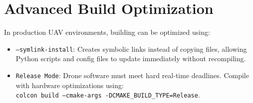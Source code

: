 \documentclass{article}
\begin{document}
\section{Advanced Build Optimization}
In production UAV environments, building can be optimized using:
\begin{itemize}
    \item \texttt{--symlink-install}: Creates symbolic links instead of copying files, allowing Python scripts and config files to update immediately without recompiling.
    \item \texttt{Release Mode}: Drone software must meet hard real-time deadlines. Compile with hardware optimizations using: \\
    \texttt{colcon build --cmake-args -DCMAKE\_BUILD\_TYPE=Release}.
\end{itemize}
\end{document}

